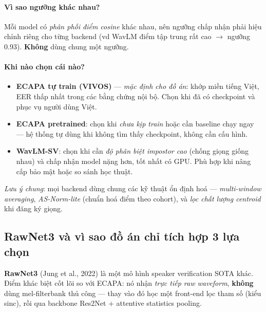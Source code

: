 \documentclass[12pt,a4paper]{article}
\begin{document}
\paragraph{Vì sao ngưỡng khác nhau?} Mỗi model có \emph{phân phối điểm cosine}
khác nhau, nên ngưỡng chấp nhận phải hiệu chỉnh riêng cho từng backend (vd WavLM
điểm tập trung rất cao $\to$ ngưỡng 0.93). \textbf{Không} dùng chung một ngưỡng.

\paragraph{Khi nào chọn cái nào?}
\begin{itemize}
  \item \textbf{ECAPA tự train (VIVOS)} --- \emph{mặc định cho đồ án}: khớp miền
  tiếng Việt, EER thấp nhất trong các bằng chứng nội bộ. Chọn khi đã có checkpoint
  và phục vụ người dùng Việt.
  \item \textbf{ECAPA pretrained}: chọn khi \emph{chưa kịp train} hoặc cần baseline
  chạy ngay --- hệ thống tự dùng khi không tìm thấy checkpoint, không cần cấu hình.
  \item \textbf{WavLM-SV}: chọn khi cần \emph{độ phân biệt impostor cao} (chống
  giọng giống nhau) và chấp nhận model nặng hơn, tốt nhất có GPU. Phù hợp khi nâng
  cấp bảo mật hoặc so sánh học thuật.
\end{itemize}

\noindent\textit{Lưu ý chung}: mọi backend dùng chung các kỹ thuật ổn định hoá
--- \emph{multi-window averaging}, \emph{AS-Norm-lite} (chuẩn hoá điểm theo
cohort), và \emph{lọc chất lượng centroid} khi đăng ký giọng.

\subsection{RawNet3 và vì sao đồ án chỉ tích hợp 3 lựa chọn}

\textbf{RawNet3} (Jung et al., 2022) là một mô hình speaker verification SOTA
khác. Điểm khác biệt cốt lõi so với ECAPA: nó nhận \emph{trực tiếp raw waveform},
\textbf{không} dùng mel-filterbank thủ công --- thay vào đó học một front-end lọc
tham số (kiểu sinc), rồi qua backbone Res2Net + attentive statistics pooling.
\end{document}

